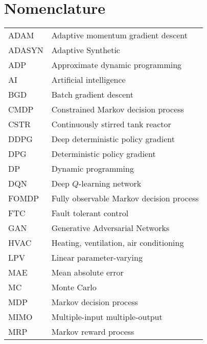 \documentclass[12pt]{report}
\begin{document}
\chapter*{Nomenclature}
\noindent 
\begin{tabular}{@{}ll}
ADAM & Adaptive momentum gradient descent \\
ADASYN & Adaptive Synthetic \\
ADP & Approximate dynamic programming \\
AI & Artificial intelligence \\
BGD & Batch gradient descent \\
CMDP & Constrained Markov decision process \\
CSTR & Continuously stirred tank reactor \\
DDPG & Deep deterministic policy gradient \\
DPG & Deterministic policy gradient \\
DP & Dynamic programming \\
DQN & Deep $Q$-learning network \\
FOMDP & Fully observable Markov decision process \\
FTC & Fault tolerant control \\
GAN & Generative Adversarial Networks \\
HVAC & Heating, ventilation, air conditioning \\
LPV & Linear parameter-varying \\
MAE & Mean absolute error \\
MC & Monte Carlo \\
MDP & Markov decision process \\
MIMO & Multiple-input multiple-output \\
MRP & Markov reward process
\end{tabular}
\end{document}
